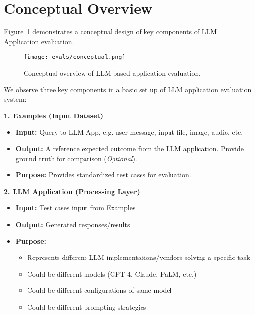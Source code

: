 \section{Conceptual Overview}

Figure~\ref{fig:conceptual} demonstrates a conceptual design of key components of LLM Application evaluation.

\begin{figure}[h]
\centering
\texttt{[image: evals/conceptual.png]}
\caption{Conceptual overview of LLM-based application evaluation.}
\label{fig:conceptual}
\end{figure}

We observe three key components in a basic set up of LLM application evaluation system:

\textbf{1. Examples (Input Dataset)}
\begin{itemize}
    \item \textbf{Input:} Query to LLM App, e.g. user message, input file, image, audio, etc.
    \item \textbf{Output:} A reference expected outcome from the LLM application. Provide ground truth for comparison (\textit{Optional}).
    \item \textbf{Purpose:} Provides standardized test cases for evaluation.
\end{itemize}

\textbf{2. LLM Application (Processing Layer)}
\begin{itemize}
    \item \textbf{Input:} Test cases input from Examples
    \item \textbf{Output:} Generated responses/results
    \item \textbf{Purpose:}
    \begin{itemize}
        \item Represents different LLM implementations/vendors solving a specific task
        \item Could be different models (GPT-4, Claude, PaLM, etc.)
        \item Could be different configurations of same model
        \item Could be different prompting strategies
    \end{itemize}
\end{itemize}


